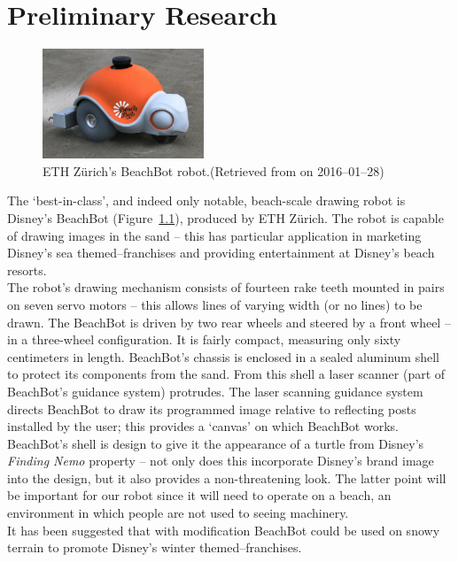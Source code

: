 \chapter{Preliminary Research}\label{research}\label{section \thechapter}

\label{sand-drawing robots}
    \begin{figure}
      \begin{center}
        \includegraphics[width=0.43\textwidth]{Files/beachbot}
      \end{center}
      \caption{ETH Z{\"u}rich's BeachBot robot.{\small (Retrieved from  on 2016--01--28)}}
      \label{fig: beachbot}
    \end{figure}
    The `best-in-class', and indeed only notable, beach-scale drawing robot is Disney's BeachBot (Figure~\ref{fig: beachbot}), produced by ETH Z{\"u}rich.\cite{beachbot} The robot is capable of drawing images in the sand -- this has particular application in marketing Disney's sea themed--franchises and providing entertainment at Disney's beach resorts.\\
    The robot's drawing mechanism consists of fourteen rake teeth mounted in pairs on seven servo motors -- this allows lines of varying width (or no lines) to be drawn. The BeachBot is driven by two rear wheels and steered by a front wheel -- in a three-wheel configuration. It is fairly compact, measuring only sixty centimeters in length. BeachBot's chassis is enclosed in a sealed aluminum shell to protect its components from the sand. From this shell a laser scanner (part of BeachBot's guidance system) protrudes. The laser scanning guidance system directs BeachBot to draw its programmed image relative to reflecting posts installed by the user; this provides a `canvas' on which BeachBot works.\\
    BeachBot's shell is design to give it the appearance of a  turtle from Disney's \emph{Finding Nemo} property -- not only does this incorporate Disney's brand image into the design, but it also provides a non-threatening look. The latter point will be important for our robot since it will need to operate on a beach, an environment in which people are not used to seeing machinery.\\
    It has been suggested that with modification BeachBot could be used on snowy terrain to promote Disney's winter themed--franchises.

